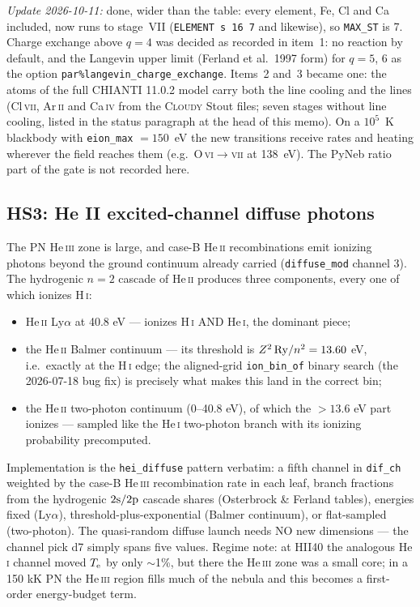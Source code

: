 \documentclass[english,a4paper]{my_memo}
\newcommand{\code}[1]{\texttt{#1}}
\newcommand{\Cloudy}{\textsc{Cloudy}}
\newcommand{\HI}{H\,\textsc{i}}
\newcommand{\HeI}{He\,\textsc{i}}
\newcommand{\HeII}{He\,\textsc{ii}}
\newcommand{\HeIII}{He\,\textsc{iii}}
\newcommand{\Te}{T_{\rm e}}
\begin{document}
\emph{Update 2026-10-11:} done, wider than the table: every element,
Fe, Cl and Ca included, now runs to stage~VII (\code{ELEMENT s 16 7} and
likewise), so \code{MAX\_ST} is 7.  Charge exchange above $q=4$ was decided
as recorded in item~1: no reaction by default, and the Langevin upper limit
(Ferland et al.\ 1997 form) for $q = 5$, 6 as the option
\code{par\%langevin\_charge\_exchange}.  Items~2 and~3 became one: the
atoms of the full CHIANTI 11.0.2 model carry both the line cooling and the
lines (Cl\,\textsc{vii}, Ar\,\textsc{ii} and Ca\,\textsc{iv} from the
\Cloudy{} Stout files; seven stages without line cooling, listed in the
status paragraph at the head of this memo).  On a $10^5$~K blackbody with
\code{eion\_max} $= 150$~eV the new transitions receive rates and heating
wherever the field reaches them (e.g.\ O\,\textsc{vi}$\rightarrow$\textsc{vii}
at 138~eV).  The PyNeb ratio part of the gate is not recorded here.

\subsection{HS3: He II excited-channel diffuse photons}

The PN \HeIII{} zone is large, and case-B \HeII{} recombinations emit
ionizing photons beyond the ground continuum already carried
(\code{diffuse\_mod} channel 3).  The hydrogenic $n=2$ cascade of
\HeII{} produces three components, every one of which ionizes \HI{}:

\begin{itemize}[leftmargin=2em]
\item \HeII{} Ly$\alpha$ at 40.8 eV --- ionizes \HI{} AND \HeI{}, the
  dominant piece;
\item the \HeII{} Balmer continuum --- its threshold is
  $Z^2\,{\rm Ry}/n^2 = 13.60$ eV, i.e.\ exactly at the \HI{} edge; the
  aligned-grid \code{ion\_bin\_of} binary search (the 2026-07-18 bug
  fix) is precisely what makes this land in the correct bin;
\item the \HeII{} two-photon continuum (0--40.8 eV), of which the
  $>13.6$ eV part ionizes --- sampled like the \HeI{} two-photon branch
  with its ionizing probability precomputed.
\end{itemize}

Implementation is the \code{hei\_diffuse} pattern verbatim: a fifth
channel in \code{dif\_ch} weighted by the case-B \HeIII{}
recombination rate in each leaf, branch fractions from the hydrogenic
$2{\rm s}/2{\rm p}$ cascade shares (Osterbrock \& Ferland tables),
energies fixed (Ly$\alpha$), threshold-plus-exponential (Balmer
continuum), or flat-sampled (two-photon).  The quasi-random diffuse
launch needs NO new dimensions --- the channel pick d7 simply spans
five values.  Regime note: at HII40 the analogous \HeI{} channel moved
$\Te$ by only $\sim$1\%, but there the \HeIII{} zone was a small core;
in a 150 kK PN the \HeIII{} region fills much of the nebula and this
becomes a first-order energy-budget term.
\end{document}
